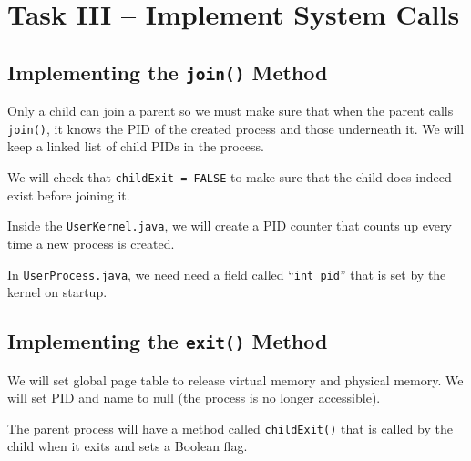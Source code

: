\documentclass[12pt, letterpaper]{report}
\newcommand{\code}[1]{\texttt{#1}}
\begin{document}
\section*{Task III -- Implement System Calls}
\subsection*{Implementing the \code{join()} Method}
Only a child can join a parent so we must make sure that when the parent
calls \code{join()},
it knows the PID of the created process and those underneath it.
We will keep a linked list of child PIDs in the process.

We will check that \code{childExit = FALSE}
to make sure that the child does indeed exist before joining it.

Inside the \code{UserKernel.java},
we will create a PID counter that counts up every time
a new process is created.

In \code{UserProcess.java},
we need need a field called ``\code{int pid}''
that is set by the kernel on startup.


\subsection*{Implementing the \code{exit()} Method}
We will set global page table to release
virtual memory and physical memory.
We will set PID and name to null (the process is no longer accessible).

The parent process will have a method called
\code{childExit()} that is called by the child when it exits
and sets a Boolean flag.
\end{document}
